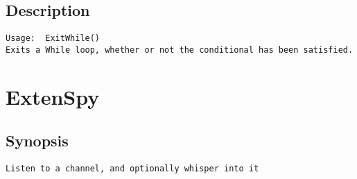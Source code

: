 \subsection{Description}
\begin{verbatim}
Usage:  ExitWhile()
Exits a While loop, whether or not the conditional has been satisfied.

\end{verbatim}


\section{ExtenSpy}
\subsection{Synopsis}
\begin{verbatim}
Listen to a channel, and optionally whisper into it
\end{verbatim}
